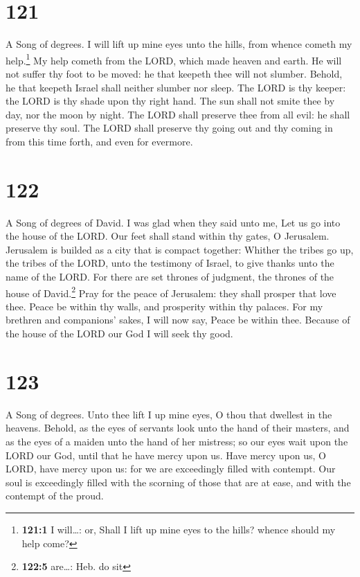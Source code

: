 \hypertarget{section-122}{%
\section{121}\label{section-122}}

A Song of degrees.  I will lift up mine eyes unto the
hills, from whence cometh my help.\footnote{\textbf{121:1} I will\ldots:
  or, Shall I lift up mine eyes to the hills? whence should my help
  come?}  My help cometh from the LORD, which made heaven
and earth.  He will not suffer thy foot to be moved: he
that keepeth thee will not slumber.  Behold, he that
keepeth Israel shall neither slumber nor sleep.  The LORD
is thy keeper: the LORD is thy shade upon thy right hand. 
The sun shall not smite thee by day, nor the moon by night.
 The LORD shall preserve thee from all evil: he shall
preserve thy soul.  The LORD shall preserve thy going out
and thy coming in from this time forth, and even for evermore.

\hypertarget{section-123}{%
\section{122}\label{section-123}}

A Song of degrees of David.  I was glad when they said
unto me, Let us go into the house of the LORD.  Our feet
shall stand within thy gates, O Jerusalem.  Jerusalem is
builded as a city that is compact together:  Whither the
tribes go up, the tribes of the LORD, unto the testimony of Israel, to
give thanks unto the name of the LORD.  For there are set
thrones of judgment, the thrones of the house of David.\footnote{\textbf{122:5}
  are\ldots: Heb. do sit}  Pray for the peace of
Jerusalem: they shall prosper that love thee.  Peace be
within thy walls, and prosperity within thy palaces.  For
my brethren and companions' sakes, I will now say, Peace be within thee.
 Because of the house of the LORD our God I will seek thy
good.

\hypertarget{section-124}{%
\section{123}\label{section-124}}

A Song of degrees.  Unto thee lift I up mine eyes, O thou
that dwellest in the heavens.  Behold, as the eyes of
servants look unto the hand of their masters, and as the eyes of a
maiden unto the hand of her mistress; so our eyes wait upon the LORD our
God, until that he have mercy upon us.  Have mercy upon
us, O LORD, have mercy upon us: for we are exceedingly filled with
contempt.  Our soul is exceedingly filled with the
scorning of those that are at ease, and with the contempt of the proud.

